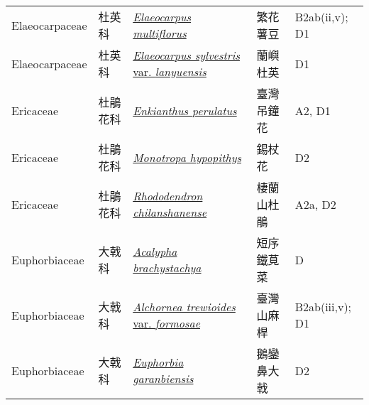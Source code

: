 {\begin{longtable}{L{2.5cm}L{2cm}L{5cm}L{2.5cm}L{3cm}}
    Elaeocarpaceae & 杜英科 & \href{http://www.theplantlist.org/tpl1.1/search?q=Elaeocarpus+multiflorus}{\textit{Elaeocarpus multiflorus} } & 繁花薯豆 & B2ab(ii,v); D1    \\
    Elaeocarpaceae & 杜英科 & \href{http://www.theplantlist.org/tpl1.1/search?q=Elaeocarpus+sylvestris+var.+lanyuensis}{\textit{Elaeocarpus sylvestris} var. \textit{lanyuensis} } & 蘭嶼杜英 & D1    \\
    Ericaceae & 杜鵑花科 & \href{http://www.theplantlist.org/tpl1.1/search?q=Enkianthus+perulatus}{\textit{Enkianthus perulatus} } & 臺灣吊鐘花 & A2, D1    \\
    Ericaceae & 杜鵑花科 & \href{http://www.theplantlist.org/tpl1.1/search?q=Monotropa+hypopithys}{\textit{Monotropa hypopithys} } & 錫杖花 & D2    \\
    Ericaceae & 杜鵑花科 & \href{http://www.theplantlist.org/tpl1.1/search?q=Rhododendron+chilanshanense}{\textit{Rhododendron chilanshanense} } & 棲蘭山杜鵑 & A2a, D2    \\
    Euphorbiaceae & 大戟科 & \href{http://www.theplantlist.org/tpl1.1/search?q=Acalypha+brachystachya}{\textit{Acalypha brachystachya} } & 短序鐵莧菜 & D    \\
    Euphorbiaceae & 大戟科 & \href{http://www.theplantlist.org/tpl1.1/search?q=Alchornea+trewioides+var.+formosae}{\textit{Alchornea trewioides} var. \textit{formosae} } & 臺灣山麻桿 & B2ab(iii,v); D1    \\
    Euphorbiaceae & 大戟科 & \href{http://www.theplantlist.org/tpl1.1/search?q=Euphorbia+garanbiensis}{\textit{Euphorbia garanbiensis} } & 鵝鑾鼻大戟 & D2    \\

\end{longtable}}

